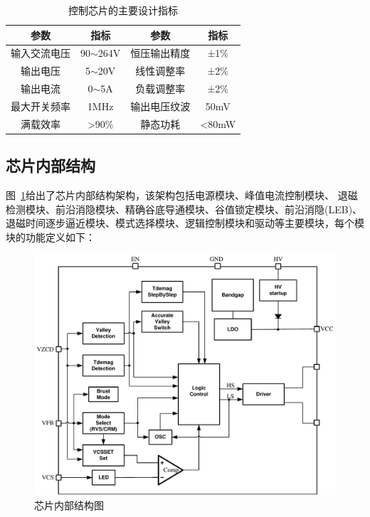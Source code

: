 \begin{table}[htbp]
    \caption{控制芯片的主要设计指标}
    \label{tab:控制芯片的主要设计指标}
    \centering
    \belowrulesep=0pt  %
    \aboverulesep=0pt  %
        \begin{tabular}{|c|c|c|c|}
            \toprule
            参数 & 指标 & 参数 & 指标 \\
            \midrule
            输入交流电压 & 90$\sim$264V  &  恒压输出精度  &   ±1\%      \\  \midrule
            输出电压     & 5$\sim$20V    &  线性调整率    &   ±2\%      \\  \midrule
            输出电流     & 0$\sim$5A     & 负载调整率     &   ±2\%      \\  \midrule  
            最大开关频率 & 1MHz          &  输出电压纹波  &   50mV       \\ \midrule 
            满载效率     & >90\%         &  静态功耗      &  <80mW       \\             
            \bottomrule
        \end{tabular}
\end{table}


\subsection{芯片内部结构}
图~\ref{fig:芯片内部结构图}给出了芯片内部结构架构，该架构包括电源模块、峰值电流控制模块、 退磁检测模块、前沿消隐模块、精确谷底导通模块、谷值锁定模块、前沿消隐(LEB)、退磁时间逐步逼近模块、模式选择模块、逻辑控制模块和驱动等主要模块，每个模块的功能定义如下：

\begin{figure}[htbp] 
    \centering
    \includegraphics[width=0.8\linewidth]{figures/芯片内部结构图.pdf}
    \caption{芯片内部结构图}
    \label{fig:芯片内部结构图}
\end{figure}

